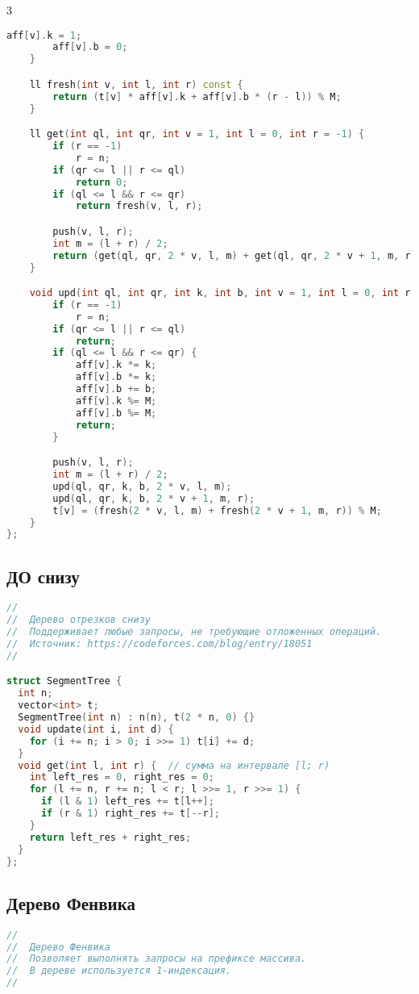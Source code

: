 \documentclass[10pt,a4paper,landscape,twosided]{extarticle}
\begin{document}
\begin{multicols}{3}
\begin{lstlisting}[language=C++]
        aff[v].k = 1;
        aff[v].b = 0;
    }

    ll fresh(int v, int l, int r) const {
        return (t[v] * aff[v].k + aff[v].b * (r - l)) % M;
    }

    ll get(int ql, int qr, int v = 1, int l = 0, int r = -1) {
        if (r == -1)
            r = n;
        if (qr <= l || r <= ql)
            return 0;
        if (ql <= l && r <= qr)
            return fresh(v, l, r);

        push(v, l, r);
        int m = (l + r) / 2;
        return (get(ql, qr, 2 * v, l, m) + get(ql, qr, 2 * v + 1, m, r)) % M;
    }

    void upd(int ql, int qr, int k, int b, int v = 1, int l = 0, int r = -1) {
        if (r == -1)
            r = n;
        if (qr <= l || r <= ql)
            return;
        if (ql <= l && r <= qr) {
            aff[v].k *= k;
            aff[v].b *= k;
            aff[v].b += b;
            aff[v].k %= M;
            aff[v].b %= M;
            return;
        }

        push(v, l, r);
        int m = (l + r) / 2;
        upd(ql, qr, k, b, 2 * v, l, m);
        upd(ql, qr, k, b, 2 * v + 1, m, r);
        t[v] = (fresh(2 * v, l, m) + fresh(2 * v + 1, m, r)) % M;
    }
};
\end{lstlisting}

\subsection{ДО снизу}
\begin{lstlisting}[language=C++]
//
//  Дерево отрезков снизу
//  Поддерживает любые запросы, не требующие отложенных операций.
//  Источник: https://codeforces.com/blog/entry/18051
//

struct SegmentTree {
  int n;
  vector<int> t;
  SegmentTree(int n) : n(n), t(2 * n, 0) {}
  void update(int i, int d) {
    for (i += n; i > 0; i >>= 1) t[i] += d;
  }
  void get(int l, int r) {  // сумма на интервале [l; r)
    int left_res = 0, right_res = 0;
    for (l += n, r += n; l < r; l >>= 1, r >>= 1) {
      if (l & 1) left_res += t[l++];
      if (r & 1) right_res += t[--r];
    }
    return left_res + right_res;
  }
};
\end{lstlisting}

\subsection{Дерево Фенвика}
\begin{lstlisting}[language=C++]
//
//  Дерево Фенвика
//  Позволяет выполнять запросы на префиксе массива.
//  В дереве используется 1-индексация.
//


\end{lstlisting}
\end{multicols}
\end{document}
